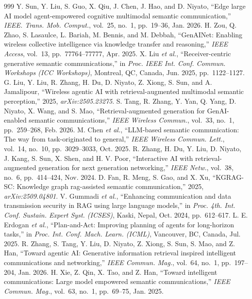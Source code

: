 \begin{thebibliography}{999}
 Y. Sun, Y. Liu, S. Guo, X. Qiu, J. Chen, J. Hao, and D. Niyato, ``Edge large AI model agent-empowered cognitive multimodal semantic communication,'' \emph{IEEE. Trans. Mob. Comput.}, vol.~25, no.~1, pp.~19--36, Jan. 2026.
 H. Zou, Q. Zhao, S. Lasaulce, L. Bariah, M. Bennis, and M. Debbah, ``GenAINet: Enabling wireless collective intelligence via knowledge transfer and reasoning,'' \emph{IEEE Access}, vol.~13, pp.~77764--77777, Apr. 2025.
 X. Liu \emph{et al.}, ``Receiver-centric generative semantic communications,'' in \emph{Proc. IEEE Int. Conf. Commun. Workshops (ICC Workshops)}, Montreal, QC, Canada, Jun. 2025, pp.~1122--1127.
 G. Liu, Y. Liu, R. Zhang, H. Du, D. Niyato, Z. Xiong, S. Sun, and A. Jamalipour, ``Wireless agentic AI with retrieval-augmented multimodal semantic perception,'' 2025, \emph{arXiv:2505.23275}.
 S. Tang, R. Zhang, Y. Yan, Q. Yang, D. Niyato, X. Wang, and S. Mao, ``Retrieval-augmented generation for GenAI-enabled semantic communications,'' \emph{IEEE Wireless Commun.}, vol.~33, no.~1, pp.~259--268, Feb. 2026.
 M. Chen \emph{et al.}, ``LLM-based semantic communication: The way from task-originated to general,'' \emph{IEEE Wireless Commun. Lett.}, vol.~14, no.~10, pp.~3029--3033, Oct. 2025.
 R. Zhang, H. Du, Y. Liu, D. Niyato, J. Kang, S. Sun, X. Shen, and H. V. Poor, ``Interactive AI with retrieval-augmented generation for next generation networking,'' \emph{IEEE Netw.}, vol.~38, no.~6, pp.~414--424, Nov. 2024.
 D. Fan, R. Meng, S. Gao, and X. Xu, ``KGRAG-SC: Knowledge graph rag-assisted semantic communication,'' 2025, \emph{arXiv:2509.04801}.
 V. Gummadi \emph{et al.}, ``Enhancing communication and data transmission security in RAG using large language models,'' in \emph{Proc. 4th. Int. Conf. Sustain. Expert Syst. (ICSES)}, Kaski, Nepal, Oct. 2024, pp.~612--617.
 L. E. Erdogan \emph{et al.}, ``Plan-and-Act: Improving planning of agents for long-horizon tasks,'' in \emph{Proc. Int. Conf. Mach. Learn. (ICML)}, Vancouver, BC, Canada, Jul. 2025.
 R. Zhang, S. Tang, Y. Liu, D. Niyato, Z. Xiong, S. Sun, S. Mao, and Z. Han, ``Toward agentic AI: Generative information retrieval inspired intelligent communications and networking,'' \emph{IEEE Commun. Mag.}, vol.~64, no.~1, pp.~197--204, Jan. 2026.
 H. Xie, Z. Qin, X. Tao, and Z. Han, ``Toward intelligent communications: Large model empowered semantic communications,'' \emph{IEEE Commun. Mag.}, vol.~63, no.~1, pp.~69--75, Jan. 2025.

\end{thebibliography}
